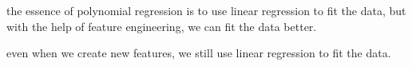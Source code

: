 \vspace{2em}
\begin{notebox}
    \hspace{2em}the essence of polynomial regression is to use linear regression to fit the data, but with the help of feature engineering, we can fit the data better.\par
    \hspace{2em}even when we create new features, we still use linear regression to fit the data.
\end{notebox}